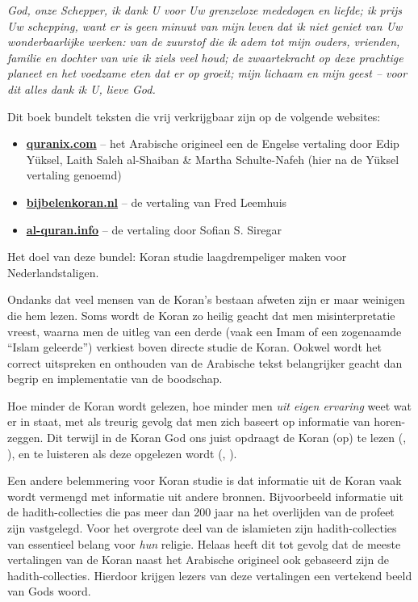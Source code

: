 
\begin{OnehalfSpace}
\emph{God, onze Schepper, ik dank U voor Uw grenzeloze mededogen en liefde; ik prijs Uw schepping, want er is geen minuut van mijn leven dat ik niet geniet van Uw wonderbaarlijke werken: van de zuurstof die ik adem tot mijn ouders, vrienden, familie en dochter van wie ik ziels veel houd; de zwaartekracht op deze prachtige planeet en het voedzame eten dat er op groeit; mijn lichaam en mijn geest -- voor dit alles dank ik U, lieve God.}
\end{OnehalfSpace}
\vspace{1cm}

\noindent Dit boek bundelt teksten die vrij verkrijgbaar zijn op de volgende websites:
\begin{itemize}
  \item \href{http://quranix.com}{\textbf{quranix.com}} -- het Arabische origineel een de Engelse vertaling door Edip Yüksel, Laith Saleh al{-}Shaiban \& Martha Schulte{-}Nafeh (hier na de Yüksel vertaling genoemd)
  \item \href{http://bijbelenkoran.nl}{\textbf{bijbelenkoran.nl}} -- de vertaling van Fred Leemhuis
  \item \href{http://al-quran.info}{\textbf{al-quran.info}} -- de vertaling door Sofian S. Siregar
\end{itemize}
Het doel van deze bundel: Koran studie laagdrempeliger maken voor Nederlandstaligen.
\vspace{0.3cm}

\noindent Ondanks dat veel mensen van de Koran's bestaan afweten zijn er maar weinigen die hem lezen.  Soms wordt de Koran zo heilig geacht dat men misinterpretatie vreest, waarna men de uitleg van een derde (vaak een Imam of een zogenaamde ``Islam geleerde'') verkiest boven directe studie de Koran.  Ookwel wordt het correct uitspreken en onthouden van de Arabische tekst belangrijker geacht dan begrip en implementatie van de boodschap.

Hoe minder de Koran wordt gelezen, hoe minder men \emph{uit eigen ervaring} weet wat er in staat, met als treurig gevolg dat men zich baseert op informatie van horen-zeggen.  Dit terwijl in de Koran God ons juist opdraagt de Koran (op) te lezen (, ), en te luisteren als deze opgelezen wordt (, ).

Een andere belemmering voor Koran studie is dat informatie uit de Koran vaak wordt vermengd met informatie uit andere bronnen.  Bijvoorbeeld informatie uit de hadith-collecties die pas meer dan 200 jaar na het overlijden van de profeet zijn vastgelegd.  Voor het overgrote deel van de islamieten zijn hadith-collecties van essentieel belang voor \emph{hun} religie.  Helaas heeft dit tot gevolg dat de meeste vertalingen van de Koran naast het Arabische origineel ook gebaseerd zijn de hadith-collecties.  Hierdoor krijgen lezers van deze vertalingen een vertekend beeld van Gods woord.

